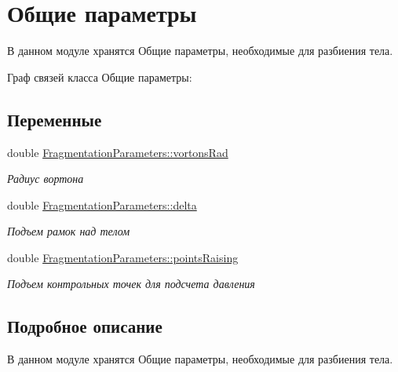 \hypertarget{group__common_parameters}{}\section{Общие параметры}
\label{group__common_parameters}


В данном модуле хранятся Общие параметры, необходимые для разбиения тела.  


Граф связей класса Общие параметры\+:
\subsection*{Переменные}
\begin{DoxyCompactItemize}
\item 
\mbox{\label{group__common_parameters_ga3d8bba533341948f927f1263580a5f17}} 
double \mbox{\hyperlink{group__common_parameters_ga3d8bba533341948f927f1263580a5f17}{Fragmentation\+Parameters\+::vortons\+Rad}}
\begin{DoxyCompactList}\small\item\em Радиус вортона \end{DoxyCompactList}\item 
\mbox{\label{group__common_parameters_gafda7b876ebcf520d19b54db6fa00afff}} 
double \mbox{\hyperlink{group__common_parameters_gafda7b876ebcf520d19b54db6fa00afff}{Fragmentation\+Parameters\+::delta}}
\begin{DoxyCompactList}\small\item\em Подъем рамок над телом \end{DoxyCompactList}\item 
\mbox{\label{group__common_parameters_ga3b7fdf07c6bb80f9c60caccde33f8a4e}} 
double \mbox{\hyperlink{group__common_parameters_ga3b7fdf07c6bb80f9c60caccde33f8a4e}{Fragmentation\+Parameters\+::points\+Raising}}
\begin{DoxyCompactList}\small\item\em Подъем контрольных точек для подсчета давления \end{DoxyCompactList}\end{DoxyCompactItemize}


\subsection{Подробное описание}
В данном модуле хранятся Общие параметры, необходимые для разбиения тела. 

